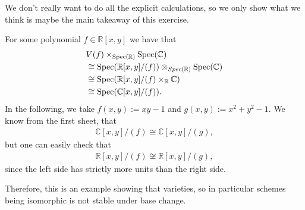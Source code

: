 \begin{exercise}{4}
    We don't really want to do all the explicit calculations, so we only show what we think
    is maybe the main takeaway of this exercise.

    For some polynomial $f\in \mathbb{R}[x,y]$ we have that 
    \begin{align*}
        &V(f) \times_{\operatorname{Spec}(\mathbb{R})} \operatorname{Spec}(\mathbb{C})\\
        &\cong \operatorname{Spec}(\mathbb{R}[x,y]/(f)) \otimes_{Spec(\mathbb{R})}\operatorname{Spec}(\mathbb{C})\\
        &\cong \operatorname{Spec}(\mathbb{R}[x,y]/(f)\times_\mathbb{R} \mathbb{C})\\
        &\cong \operatorname{Spec}(\mathbb{C}[x,y]/(f)).
    \end{align*}
    In the following, we take $f(x,y):=xy-1$ and $g(x,y):=x^2+y^2-1$. We know from 
    the first sheet, that 
    \begin{align*}
        \mathbb{C}[x,y]/(f)\cong \mathbb{C}[x,y]/(g),
    \end{align*}
    but one can easily check that
    \begin{align*}
        \mathbb{R}[x,y]/(f) \not \cong \mathbb{R}[x,y]/(g),
    \end{align*}
    since the left side has strictly more units than the right side.

    Therefore, this is an example showing that varieties, so in particular schemes being isomorphic 
    is not stable under base change.
\end{exercise}


